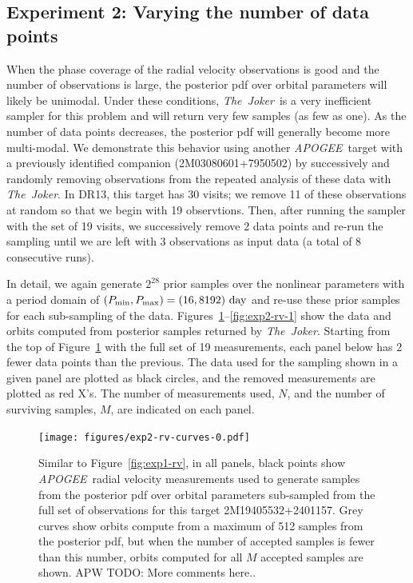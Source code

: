 \documentclass[manuscript, letterpaper]{aastex6}
\newcommand{\project}[1]{\textsl{#1}}
\newcommand{\acronym}[1]{{\small{#1}}}
\newcommand{\apogee}{\project{\acronym{APOGEE}}}
\newcommand{\samplername}{\project{The~Joker}}
\newcommand{\todoapw}[1]{{\color{red}APW TODO: #1}}
\begin{document}
\subsection{Experiment 2: Varying the number of data points}

When the phase coverage of the radial velocity observations is good and the
number of observations is large, the posterior pdf over orbital parameters will
likely be unimodal.
Under these conditions, \samplername\ is a very inefficient sampler for this
problem and will return very few samples (as few as one).
As the number of data points decreases, the posterior pdf will generally become
more multi-modal.
We demonstrate this behavior using another \apogee\ target with a previously
identified companion (2M03080601+7950502) by successively and randomly removing
observations from the repeated analysis of these data with \samplername.
In DR13, this target has 30 visits; we remove 11 of these observations at random
so that we begin with 19 observtions.
Then, after running the sampler with the set of 19 visits, we successively
remove 2 data points and re-run the sampling until we are left with 3
observations as input data (a total of 8 consecutive runs).

In detail, we again generate $2^{28}$ prior samples over the nonlinear
parameters with a period domain of $(P_{\rm min}, P_{\rm max}) = (16, 8192)~{\rm
day}$ and re-use these prior samples for each sub-sampling of the data.
Figures~\ref{fig:exp2-rv-0}--\ref{fig:exp2-rv-1} show the data and orbits
computed from posterior samples returned by \samplername.
Starting from the top of Figure~\ref{fig:exp2-rv-0} with the full set of 19
measurements, each panel below has 2 fewer data points than the previous.
The data used for the sampling shown in a given panel are plotted as black
circles, and the removed measurements are plotted as red X's.
The number of measurements used, $N$, and the number of surviving samples, $M$,
are indicated on each panel.

\begin{figure}[p]
\begin{center}
\texttt{[image: figures/exp2-rv-curves-0.pdf]}
\end{center}
\caption{%
Similar to Figure~\ref{fig:exp1-rv}, in all panels, black points show \apogee\
radial velocity measurements used to generate samples from the posterior pdf
over orbital parameters sub-sampled from the full set of observations for this
target 2M19405532+2401157.
Grey curves show orbits compute from a maximum of 512 samples from the
posterior pdf, but when the number of accepted samples is fewer than this
number, orbits computed for all $M$ accepted samples are shown.
\todoapw{More comments here..}
\label{fig:exp2-rv-0}}
\end{figure}
\end{document}
